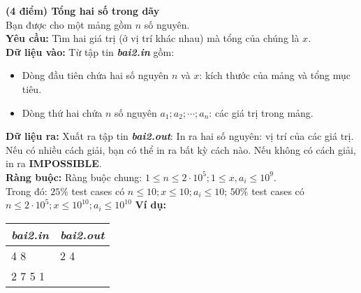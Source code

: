\begin{ex}
	\textbf{(4 điểm) Tổng hai số trong dãy}\\
	Bạn được cho một mảng gồm $n$ số nguyên. \\
	\textbf{Yêu cầu: } Tìm hai giá trị (ở vị trí khác nhau) mà tổng của chúng là $x$.\\
	\textbf{Dữ liệu vào: } Từ tập tin \textbf{\textit{bai2.in}} gồm: 
	\begin{itemize}
		\item Dòng đầu tiên chứa hai số nguyên $n$ và $x$: kích thước của mảng và tổng mục tiêu. 
		\item Dòng thứ hai chứa $n$ số nguyên $a_1; a_2; \cdots; a_n$: các giá trị trong mảng. 
	\end{itemize}
	\textbf{Dữ liệu ra: } Xuất ra tập tin \textbf{\textit{bai2.out}}: 
	In ra hai số nguyên: vị trí của các giá trị. Nếu có nhiều cách giải, bạn có thể in ra bất kỳ cách nào. Nếu không có cách giải, in ra \textbf{IMPOSSIBLE}. \\
	\textbf{Ràng buộc: } Ràng buộc chung: $1 \leq n \leq 2 \cdot 10^5; 1 \leq x , a_i \leq 10^9$. \\
	Trong đó: $25\%$ test cases có $n \leq 10; x \leq 10; a_i \leq 10$; $50\%$ test cases có $n \leq 2\cdot 10^5; x \leq 10^{10}; a_i \leq 10^{10} $
	\textbf{Ví dụ: }
	\begin{center}
		\begin{tabular}{|l|l|}
			\hline
			\textbf{\textit{bai2.in}} & \textbf{\textit{bai2.out}}\\
			\hline
			4 8 & 2 4 \\
			2 7 5 1 & \\
			\hline
		\end{tabular}
	\end{center}
\end{ex}